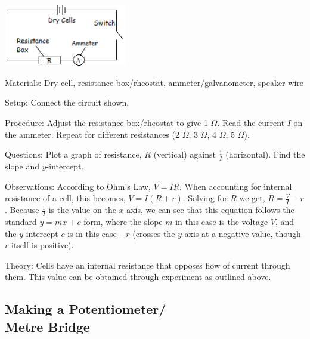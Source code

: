 \begin{multicols}{2}
\begin{center}
\includegraphics[width=0.4\textwidth]{./img/ohms-law.png}
\end{center}

\begin{description*}
\item[Materials:]{Dry cell, resistance box/rheostat, ammeter/galvanometer, speaker wire}
\item[Setup:]{Connect the circuit shown.}
\item[Procedure:]{Adjust the resistance box/rheostat to give 1 $\Omega$. Read the current $I$ on the ammeter. Repeat for different resistances (2 $\Omega$, 3 $\Omega$, 4 $\Omega$, 5 $\Omega$).}
\item[Questions:]{Plot a graph of resistance, $R$ (vertical) against $\frac{1}{I}$ (horizontal). Find the slope and $y$-intercept.}
\item[Observations:]{According to Ohm's Law, $V = IR$. When accounting for internal resistance of a cell, this becomes, $V = I(R + r)$. Solving for $R$ we get, $R = \frac{V}{I} - r$. Because $\frac{1}{I}$ is the value on the $x$-axis, we can see that this equation follows the standard $y=mx+c$ form, where the slope $m$ in this case is the voltage $V$, and the $y$-intercept $c$ is in this case $-r$ (crosses the $y$-axis at a negative value, though $r$ itself is positive).}
\item[Theory:]{Cells have an internal resistance that opposes flow of current through them. This value can be obtained through experiment as outlined above.}
\end{description*}

\vfill
\columnbreak

\subsection[Making a Potentiometer/Metre Bridge]{Making a Potentiometer/ \hfill \\ Metre Bridge}    


\end{multicols}
